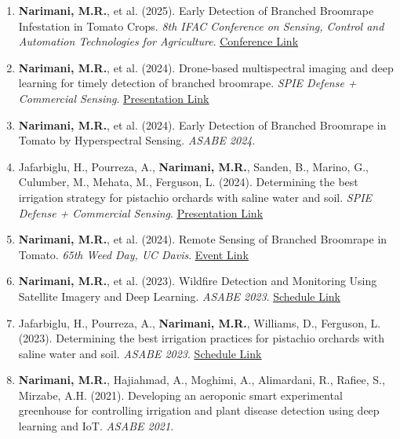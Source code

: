 \documentclass[11pt,a4paper]{article}
\begin{document}
\begin{enumerate}
\item \textbf{Narimani, M.R.}, et al. (2025). Early Detection of Branched Broomrape Infestation in Tomato Crops. \textit{8th IFAC Conference on Sensing, Control and Automation Technologies for Agriculture}. \href{https://ifac.papercept.net/conferences/conferences/AGRI25/program/AGRI25_ContentListWeb_1.html\#weds2tb_03}{\underline{Conference Link}}

\item \textbf{Narimani, M.R.}, et al. (2024). Drone-based multispectral imaging and deep learning for timely detection of branched broomrape. \textit{SPIE Defense + Commercial Sensing}. \href{https://www.spiedigitallibrary.org/conference-proceedings-of-spie/13053/1305304/Drone-based-multispectral-imaging-and-deep-learning-for-timely-detection/10.1117/12.3021219.full}{\underline{Presentation Link}}

\item \textbf{Narimani, M.R.}, et al. (2024). Early Detection of Branched Broomrape in Tomato by Hyperspectral Sensing. \textit{ASABE 2024}.

\item Jafarbiglu, H., Pourreza, A., \textbf{Narimani, M.R.}, Sanden, B., Marino, G., Culumber, M., Mehata, M., Ferguson, L. (2024). Determining the best irrigation strategy for pistachio orchards with saline water and soil. \textit{SPIE Defense + Commercial Sensing}. \href{https://www.spiedigitallibrary.org/conference-proceedings-of-spie/PC13053/PC1305301/Determining-the-best-irrigation-strategy-for-pistachio-orchards-with-saline/10.1117/12.3021227.full}{\underline{Presentation Link}}

\item \textbf{Narimani, M.R.}, et al. (2024). Remote Sensing of Branched Broomrape in Tomato. \textit{65th Weed Day, UC Davis}. \href{https://wric.ucdavis.edu/events/weed_day_2024.html}{\underline{Event Link}}

\item \textbf{Narimani, M.R.}, et al. (2023). Wildfire Detection and Monitoring Using Satellite Imagery and Deep Learning. \textit{ASABE 2023}. \href{https://www.asabe.org/Portals/0/Events/2023\%20AIM/Tech.Schd.wPres.pdf}{\underline{Schedule Link}}

\item Jafarbiglu, H., Pourreza, A., \textbf{Narimani, M.R.}, Williams, D., Ferguson, L. (2023). Determining the best irrigation practices for pistachio orchards with saline water and soil. \textit{ASABE 2023}. \href{https://www.asabe.org/Portals/0/Events/2023\%20AIM/Tech.Schd.wPres.pdf}{\underline{Schedule Link}}

\item \textbf{Narimani, M.R.}, Hajiahmad, A., Moghimi, A., Alimardani, R., Rafiee, S., Mirzabe, A.H. (2021). Developing an aeroponic smart experimental greenhouse for controlling irrigation and plant disease detection using deep learning and IoT. \textit{ASABE 2021}.
\end{enumerate}
\end{document}

